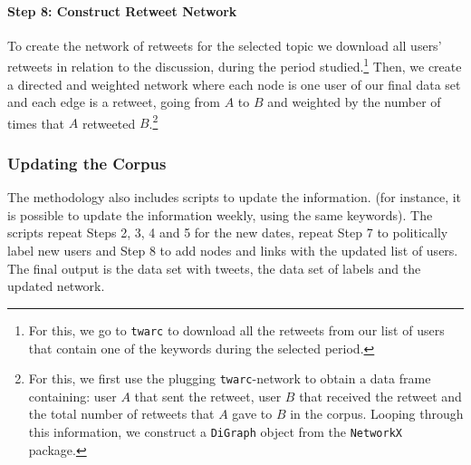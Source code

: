             
  
            \paragraph{Step 8: Construct Retweet Network}
            
            \newline\indent 
            
            To create the network of retweets for the selected topic we download all users' retweets in relation to the discussion, during the period studied.\footnote{For this, we go to \texttt{twarc} to download all the retweets from our list of users that contain one of the keywords during the selected period.}
            Then, we create a directed and weighted network where each node is one user of our final data set and each edge is a retweet, going from $A$ to $B$ and weighted by the number of times that $A$ retweeted $B$.\footnote{For this, we first use the plugging \texttt{twarc}-network to obtain a data frame containing: user $A$ that sent the retweet, user $B$ that received the retweet and the total number of retweets that $A$ gave to $B$ in the corpus. Looping through this information, we construct a  \texttt{DiGraph} object from the \texttt{NetworkX} package.}
            

            
            \subsubsection{Updating the Corpus}
            
            The methodology also includes scripts to update the information. %
            (for instance, it is possible to update the information weekly, using the same keywords).
            The scripts repeat Steps 2, 3, 4 and 5 for the new dates, repeat Step 7 to politically label new users and Step 8 to add nodes and links with the updated list of users. 
            The final output is the data set with tweets, the data set of labels and the updated network.
            

